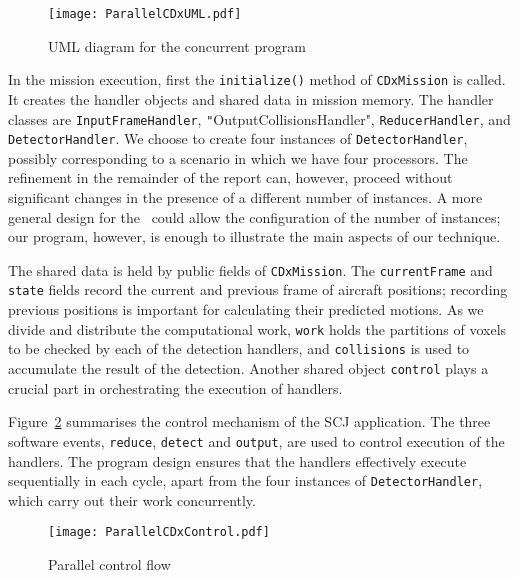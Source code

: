 \begin{figure}[t]
  \centering
  \texttt{[image: ParallelCDxUML.pdf]}
  \caption{UML diagram for the concurrent {\CDx} program}
  \label{fig:ParallelCDxUML}
\end{figure}

In the mission execution, first the \verb"initialize()" method of \verb"CDxMission" is called. It creates the handler objects and shared data in mission memory. The handler classes are \verb"InputFrameHandler", \texttt"OutputCollisions\-Handler", \verb"ReducerHandler", and \verb"DetectorHandler". We choose to create four instances of \verb"DetectorHandler", possibly corresponding to a scenario in which we have four processors. The refinement in the remainder of the report can, however, proceed without significant changes in the presence of a different number of instances. A more general design for the \CDx\ could allow the configuration of the number of instances; our program, however, is enough to illustrate the main aspects of our technique.

The shared data is held by public fields of \verb"CDxMission". The \verb"currentFrame" and \verb"state" fields record the current and previous frame of aircraft positions; recording previous positions is important for calculating their predicted motions. As we divide and distribute the computational work, \verb"work" holds the partitions of voxels to be checked by each of the detection handlers, and \verb"collisions" is used to accumulate the result of the detection. Another shared object \verb"control" plays a crucial part in orchestrating the execution of handlers.

Figure~\ref{fig:ParallelCDxControl} summarises the control mechanism of the SCJ application. The three software events, \verb"reduce", \verb"detect" and \verb"output", are used to control execution of the handlers. The program design ensures that the handlers effectively execute sequentially in each cycle, apart from the four instances of \verb"DetectorHandler", which carry out their work concurrently.

\begin{figure}[t]
  \centering
  \texttt{[image: ParallelCDxControl.pdf]}
  \caption{Parallel {\CDx} control flow}
  \label{fig:ParallelCDxControl}
\end{figure}


